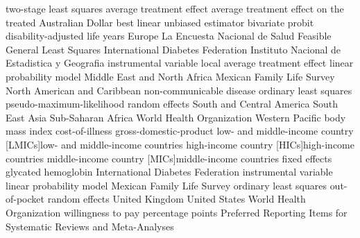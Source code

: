  {two-stage least squares}
 {average treatment effect}
 {average treatment effect on the treated}
 {Australian Dollar}
 {best linear unbiased estimator}
 {bivariate probit}
 {disability-adjusted life years}
 {Europe}
 {La Encuesta Nacional de Salud}
 {Feasible General Least Squares}
 {International Diabetes Federation}
 {Instituto Nacional de Estad\´istica y Geograf\´ia} 
 {instrumental variable}
 {local average treatment effect}
 {linear probability model}
 {Middle East and North Africa}
 {Mexican Family Life Survey}
 {North American and Caribbean}
 {non-communicable disease}
 {ordinary least squares}
 {pseudo-maximum-likelihood}
 {random effects}
 {South and Central America}
 {South East Asia}
 {Sub-Saharan Africa}
 {World Health Organization}
 {Western Pacific}
 {body mass index}  
 {cost-of-illness} 
 {gross-domestic-product} 
 {low- and middle-income country}   
[LMICs]{low- and middle-income countries}  
 {high-income country} 
[HICs]{high-income countries}
 {middle-income country}  
[MICs]{middle-income countries} 
 {fixed effects}  
 {glycated hemoglobin}  
 {International Diabetes Federation}  
 {instrumental variable}  
 {linear probability model}  
 {Mexican Family Life Survey}  
 {ordinary least squares} 
 {out-of-pocket}   
 {random effects}  
 {United Kingdom}
 {United States}
 {World Health Organization} 
 {willingness to pay}    
 {percentage points} 
 {Preferred Reporting Items for Systematic Reviews and Meta-Analyses}
